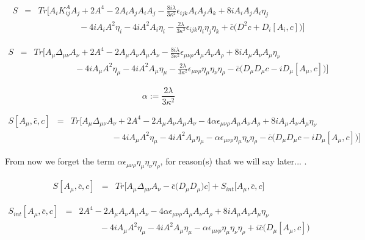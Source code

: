 \documentclass[a4paper,11pt]{article} %
\numberwithin{equation}{section} %
\numberwithin{figure}{section} %
\theoremstyle{plain} %
\theoremstyle{definition} %
\theoremstyle{remark} %
\begin{document}
\begin{eqnarray*}
 S &=& Tr \Bigg[ A_i K^{A}_{ij} A_j + 2 A^4 - 2 A_i A_j A_i A_j - \frac{8i \lambda}{3 \kappa^2} \epsilon_{ijk} A_i A_j A_k + 8i A_i A_j A_i \eta_j \\ 
   && \hspace{2cm} - 4i A_i A^2 \eta_i - 4i A^2 A_i \eta_i - \frac{2 \lambda}{3 \kappa^2} \epsilon_{ijk} \eta_{i} \eta_j \eta_k + \bar{c} \big( D^2 c +D_i [A_i , c] \big) \Bigg]   
\end{eqnarray*}

\begin{eqnarray*}
 S &=& Tr \Bigg[ A_\mu \Delta_{\mu \nu} A_\nu + 2 A^4 - 2 A_\mu A_\nu A_\mu A_\nu - \frac{8i \lambda}{3 \kappa^2} \epsilon_{\mu \nu \rho} A_\mu A_\nu A_\rho + 8i A_\mu A_\nu A_\mu \eta_\nu \\ 
   && \hspace{2cm} - 4i A_\mu A^2 \eta_\mu - 4i A^2 A_\mu \eta_\mu - \frac{2 \lambda}{3 \kappa^2} \epsilon_{\mu \nu \rho} \eta_{\mu} \eta_\nu \eta_\rho - \bar{c} \big( D_\mu D_\mu c - i D_\mu [A_\mu , c] \big) \Bigg]   
\end{eqnarray*}

\begin{equation*}
 \alpha := \frac{2 \lambda}{3 \kappa^2}
\end{equation*}

\begin{eqnarray*}
 S [A_\mu , \bar{c} , c ] &=& Tr \Bigg[ A_\mu \Delta_{\mu \nu} A_\nu + 2 A^4 - 2 A_\mu A_\nu A_\mu A_\nu - 4 \alpha \epsilon_{\mu \nu \rho} A_\mu A_\nu A_\rho + 8i A_\mu A_\nu A_\mu \eta_\nu \\ 
   && \hspace{2cm} - 4i A_\mu A^2 \eta_\mu - 4i A^2 A_\mu \eta_\mu - \alpha \epsilon_{\mu \nu \rho} \eta_{\mu} \eta_\nu \eta_\rho - \bar{c} \big( D_\mu D_\mu c - i D_\mu [A_\mu , c] \big) \Bigg]   
\end{eqnarray*}

\noindent
From now we forget the term $\alpha \epsilon_{\mu \nu \rho} \eta_{\mu} \eta_\nu \eta_\rho$, for reason(s) that we will say later... .

\begin{eqnarray*}
 S [A_\mu , \bar{c} , c ] &=& Tr \Bigg[ A_\mu \Delta_{\mu \nu} A_\nu - \bar{c} \big( D_\mu D_\mu \big) c  \Bigg]   + S_{int} \big[ A_\mu , \bar{c} , c \big]
\end{eqnarray*}

\begin{eqnarray*}
 S_{int} [A_\mu , \bar{c} , c ] &=& 2 A^4 - 2 A_\mu A_\nu A_\mu A_\nu - 4 \alpha \epsilon_{\mu \nu \rho} A_\mu A_\nu A_\rho + 8i A_\mu A_\nu A_\mu \eta_\nu \\ 
   && \hspace{1cm} - 4i A_\mu A^2 \eta_\mu - 4i A^2 A_\mu \eta_\mu - \alpha \epsilon_{\mu \nu \rho} \eta_{\mu} \eta_\nu \eta_\rho + i \bar{c} \big( D_\mu [A_\mu , c] \big) 
\end{eqnarray*}
\end{document}
